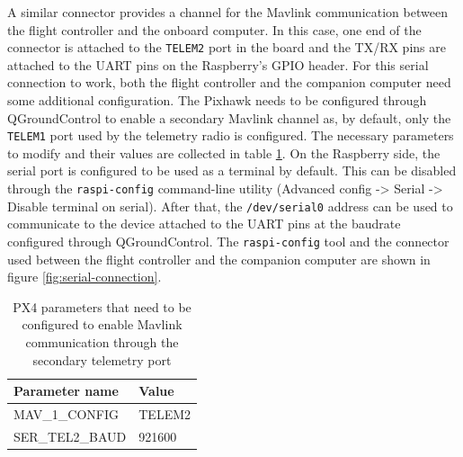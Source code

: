 A similar connector provides a channel for the Mavlink communication between the flight controller and the onboard computer.
In this case, one end of the connector is attached to the \texttt{TELEM2} port in the board and the TX/RX pins are attached to the UART pins on the Raspberry's GPIO header.
For this serial connection to work, both the flight controller and the companion computer need some additional configuration.
The Pixhawk needs to be configured through QGroundControl to enable a secondary Mavlink channel as, by default, only the \texttt{TELEM1} port used by the telemetry radio is configured.
The necessary parameters to modify and their values are collected in table \ref{tab:telem2-params}.
On the Raspberry side, the serial port is configured to be used as a terminal by default.
This can be disabled through the \texttt{raspi-config} command-line utility (Advanced config -> Serial -> Disable terminal on serial).
After that, the \texttt{/dev/serial0} address can be used to communicate to the device attached to the UART pins at the baudrate configured through QGroundControl.
The \texttt{raspi-config} tool and the connector used between the flight controller and the companion computer are shown in figure \ref{fig:serial-connection}.

\begin{table}[h!]
 \begin{center}
  \begin{tabular}{l|l}
    Parameter name & Value \\ \hline
    MAV\_1\_CONFIG & TELEM2 \\
    SER\_TEL2\_BAUD & 921600 \\
  \end{tabular}
  \caption{PX4 parameters that need to be configured to enable Mavlink communication through the secondary telemetry port}
  \label{tab:telem2-params}
 \end{center}
\end{table}


